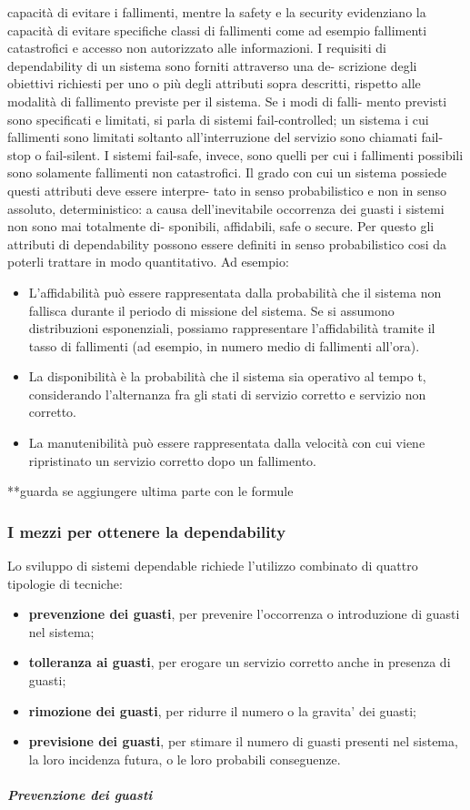 \documentclass[14pt]{extarticle}
\begin{document}
capacità di evitare i fallimenti, mentre la safety e la security evidenziano la
capacità di evitare specifiche classi di fallimenti come ad esempio fallimenti
catastrofici e accesso non autorizzato alle informazioni.
I requisiti di dependability di un sistema sono forniti attraverso una de-
scrizione degli obiettivi richiesti per uno o più degli attributi sopra descritti,
rispetto alle modalità di fallimento previste per il sistema. Se i modi di falli-
mento previsti sono specificati e limitati, si parla di sistemi fail-controlled; un
sistema i cui fallimenti sono limitati soltanto all’interruzione del servizio sono
chiamati fail-stop o fail-silent. I sistemi fail-safe, invece, sono quelli per cui i
fallimenti possibili sono solamente fallimenti non catastrofici.
Il grado con cui un sistema possiede questi attributi deve essere interpre-
tato in senso probabilistico e non in senso assoluto, deterministico: a causa
dell’inevitabile occorrenza dei guasti i sistemi non sono mai totalmente di-
sponibili, affidabili, safe o secure. Per questo gli attributi di dependability
possono essere definiti in senso probabilistico cosi da poterli trattare in modo
quantitativo.
Ad esempio:
\begin{itemize}
\item L’affidabilità può essere rappresentata dalla probabilità che il sistema
non fallisca durante il periodo di missione del sistema. Se si assumono
distribuzioni esponenziali, possiamo rappresentare l’affidabilità tramite
il tasso di fallimenti (ad esempio, in numero medio di fallimenti all’ora).
\item La disponibilità è la probabilità che il sistema sia operativo al tempo t,
considerando l’alternanza fra gli stati di servizio corretto e servizio non
corretto.
\item La manutenibilità può essere rappresentata dalla velocità con cui viene
ripristinato un servizio corretto dopo un fallimento.

\end{itemize}
**guarda se aggiungere ultima parte con le formule

\subsubsection{I mezzi per ottenere la dependability}
Lo sviluppo di sistemi dependable richiede l’utilizzo combinato di quattro
tipologie di tecniche:
\begin{itemize}

\item \textbf{prevenzione dei guasti}, per prevenire l’occorrenza o introduzione di
guasti nel sistema;
\item \textbf{tolleranza ai guasti}, per erogare un servizio corretto anche in presenza
di guasti;
\item \textbf{rimozione dei guasti}, per ridurre il numero o la gravita’ dei guasti;
\item \textbf{previsione dei guasti}, per stimare il numero di guasti presenti nel
sistema, la loro incidenza futura, o le loro probabili conseguenze.

\end{itemize}
\subparagraph{Prevenzione dei guasti}
\end{document}
